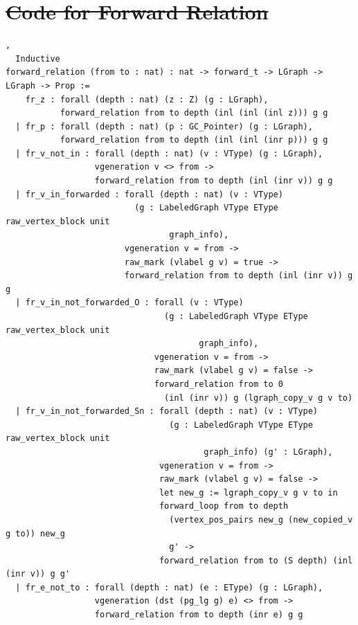 \documentclass[acmsmall,screen]{acmart}  %
\providecommand{\DIFdel}[1]{{\protect\color{red}\sout{#1}}}                      %
\begin{document}
\section{\texorpdfstring{\DIFdel{Code for Forward Relation}}{XXX}}
\addtocounter{section}{-1}%
\begin{lstlisting}[basicstyle=\normalfont\tiny\tt],
  Inductive
forward_relation (from to : nat) : nat -> forward_t -> LGraph -> LGraph -> Prop :=
    fr_z : forall (depth : nat) (z : Z) (g : LGraph),
           forward_relation from to depth (inl (inl (inl z))) g g
  | fr_p : forall (depth : nat) (p : GC_Pointer) (g : LGraph),
           forward_relation from to depth (inl (inl (inr p))) g g
  | fr_v_not_in : forall (depth : nat) (v : VType) (g : LGraph),
                  vgeneration v <> from ->
                  forward_relation from to depth (inl (inr v)) g g
  | fr_v_in_forwarded : forall (depth : nat) (v : VType)
                          (g : LabeledGraph VType EType raw_vertex_block unit
                                 graph_info),
                        vgeneration v = from ->
                        raw_mark (vlabel g v) = true ->
                        forward_relation from to depth (inl (inr v)) g g
  | fr_v_in_not_forwarded_O : forall (v : VType)
                                (g : LabeledGraph VType EType raw_vertex_block unit
                                       graph_info),
                              vgeneration v = from ->
                              raw_mark (vlabel g v) = false ->
                              forward_relation from to 0 
                                (inl (inr v)) g (lgraph_copy_v g v to)
  | fr_v_in_not_forwarded_Sn : forall (depth : nat) (v : VType)
                                 (g : LabeledGraph VType EType raw_vertex_block unit
                                        graph_info) (g' : LGraph),
                               vgeneration v = from ->
                               raw_mark (vlabel g v) = false ->
                               let new_g := lgraph_copy_v g v to in
                               forward_loop from to depth
                                 (vertex_pos_pairs new_g (new_copied_v g to)) new_g
                                 g' ->
                               forward_relation from to (S depth) (inl (inr v)) g g'
  | fr_e_not_to : forall (depth : nat) (e : EType) (g : LGraph),
                  vgeneration (dst (pg_lg g) e) <> from ->
                  forward_relation from to depth (inr e) g g

\end{lstlisting}
\end{document}

